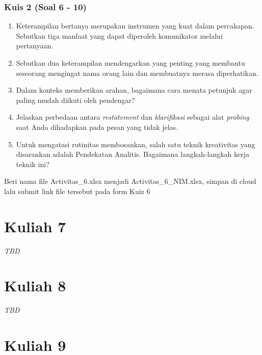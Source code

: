 \documentclass[
  letterpaper,
  DIV=11,
  numbers=noendperiod]{scrreprt}
\providecommand{\tightlist}{%
  \setlength{\itemsep}{0pt}\setlength{\parskip}{0pt}}
\begin{document}
\subsection{Kuis 2 (Soal 6 - 10)}\label{kuis-2-soal-6---10}

\begin{enumerate}
\def\labelenumi{\arabic{enumi}.}
\setcounter{enumi}{5}
\tightlist
\item
  Keterampilan bertanya merupakan instrumen yang kuat dalam percakapan.
  Sebutkan tiga manfaat yang dapat diperoleh komunikator melalui
  pertanyaan.
\item
  Sebutkan dua keterampilan mendengarkan yang penting yang membantu
  seseorang mengingat nama orang lain dan membuatnya merasa
  diperhatikan.
\item
  Dalam konteks memberikan arahan, bagaimana cara menata petunjuk agar
  paling mudah diikuti oleh pendengar?
\item
  Jelaskan perbedaan antara \emph{restatement} dan \emph{klarifikasi}
  sebagai alat \emph{probing} saat Anda dihadapkan pada pesan yang tidak
  jelas.
\item
  Untuk mengatasi rutinitas membosankan, salah satu teknik kreativitas
  yang disarankan adalah Pendekatan Analitis. Bagaimana langkah-langkah
  kerja teknik ini?
\end{enumerate}

Beri nama file Activitas\_6.xlsx menjadi Activitas\_6\_NIM.xlsx, simpan
di cloud lalu submit link file tersebut pada form Kuiz 6


\chapter{Kuliah 7}\label{kuliah-7}

\emph{TBD}


\chapter{Kuliah 8}\label{kuliah-8}

\emph{TBD}


\chapter{Kuliah 9}\label{kuliah-9}
\end{document}
